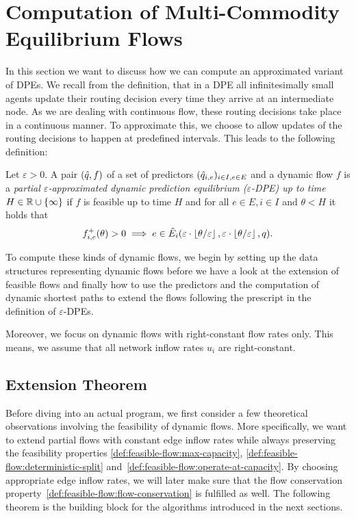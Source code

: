 \section{Computation of Multi-Commodity Equilibrium Flows}

In this section we want to discuss how we can compute an approximated variant of DPEs.
We recall from the definition, that in a DPE all infinitesimally small agents update their routing decision every time they arrive at an intermediate node.
As we are dealing with continuous flow, these routing decisions take place in a continuous manner.
To approximate this, we choose to allow updates of the routing decisions to happen at predefined intervals.
This leads to the following definition:

\begin{definition}
    Let $\varepsilon > 0$.
    A pair $(\hat q, f)$ of a set of predictors $(\hat q_{i,e})_{i\in I, e\in E}$ and a dynamic flow $f$ is a \emph{partial $\varepsilon$-approximated dynamic prediction equilibrium ($\varepsilon$-DPE) up to time $H\in\mathbb{R}\cup\{\infty\}$} if $f$ is feasible up to time $H$ and for all $e\in E, i\in I$ and $\theta < H$ it holds that
    \[
        {f}^+_{i,e}(\theta) > 0 \implies e \in \hat E_i(\varepsilon\cdot \left\lfloor{\theta / \varepsilon}\right\rfloor, \varepsilon\cdot \left\lfloor{\theta / \varepsilon}\right\rfloor, q).
    \]
\end{definition}

To compute these kinds of dynamic flows, we begin by setting up the data structures representing dynamic flows before we have a look at the extension of feasible flows and finally how to use the predictors and the computation of dynamic shortest paths to extend the flows following the prescript in the definition of $\varepsilon$-DPEs.

Moreover, we focus on dynamic flows with right-constant flow rates only.
This means, we assume that all network inflow rates $u_i$ are right-constant.

\subsection{Extension Theorem}

Before diving into an actual program, we first consider a few theoretical observations involving the feasibility of dynamic flows.
More specifically, we want to extend partial flows with constant edge inflow rates while always preserving the feasibility properties \ref{def:feasible-flow:max-capacity}, \ref{def:feasible-flow:deterministic-split} and~\ref{def:feasible-flow:operate-at-capacity}.
By choosing appropriate edge inflow rates, we will later make sure that the flow conservation property~\ref{def:feasible-flow:flow-conservation} is fulfilled as well. 
The following theorem is the building block for the algorithms introduced in the next sections.

